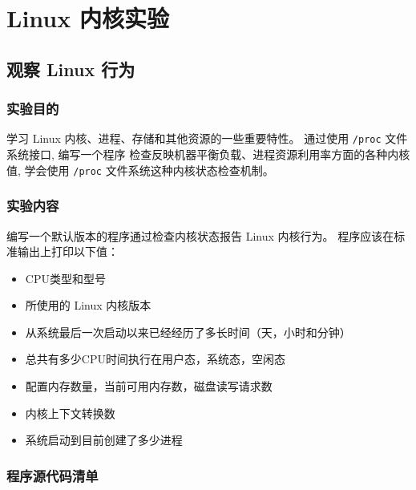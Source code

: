 \documentclass[blue,normal,cn]{elegantnote}
\newcommand{\code}[1]{\colorbox{light-gray}{\texttt{#1}}}
\begin{document}
\section{Linux 内核实验}
\subsection{观察 Linux 行为}
\subsubsection{实验目的}
学习 Linux 内核、进程、存储和其他资源的一些重要特性。
通过使用 \code{/proc} 文件系统接口, 编写一个程序
检查反映机器平衡负载、进程资源利用率方面的各种内核值, 
学会使用 \code{/proc} 文件系统这种内核状态检查机制。
\subsubsection{实验内容}
编写一个默认版本的程序通过检查内核状态报告 Linux 内核行为。
程序应该在标准输出上打印以下值：
\begin{itemize}
  \item CPU类型和型号
  \item 所使用的 Linux 内核版本
  \item 从系统最后一次启动以来已经经历了多长时间（天，小时和分钟）
  \item 总共有多少CPU时间执行在用户态，系统态，空闲态
  \item 配置内存数量，当前可用内存数，磁盘读写请求数
  \item 内核上下文转换数
  \item 系统启动到目前创建了多少进程
\end{itemize}

\subsubsection{程序源代码清单}
\end{document}
